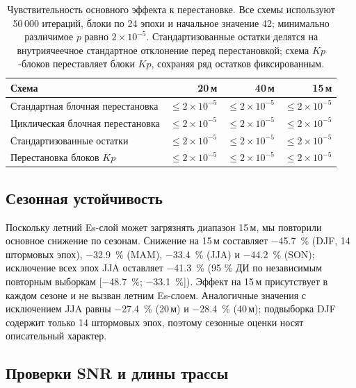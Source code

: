 \documentclass{agujournal2019}
\begin{document}
\begin{table}[h]
	\centering
	\small
	\caption{Чувствительность основного эффекта к перестановке. Все схемы
		используют 50\,000 итераций, блоки по 24 эпохи и начальное значение 42;
		минимально различимое $p$ равно $2 \times 10^{-5}$.
		Стандартизованные остатки делятся на внутриячеечное стандартное
		отклонение перед перестановкой; схема $Kp$-блоков переставляет
		блоки $Kp$, сохраняя ряд остатков фиксированным.}
	\label{tab:perm}
	\begin{tabular}{lrrr}
		\toprule
		Схема & 20\,м & 40\,м & 15\,м \\
		\midrule
		Стандартная блочная перестановка      & $\le 2\times10^{-5}$ & $\le 2\times10^{-5}$ & $\le 2\times10^{-5}$ \\
		Циклическая блочная перестановка      & $\le 2\times10^{-5}$ & $\le 2\times10^{-5}$ & $\le 2\times10^{-5}$ \\
		Стандартизованные остатки          & $\le 2\times10^{-5}$ & $\le 2\times10^{-5}$ & $\le 2\times10^{-5}$ \\
		Перестановка блоков $Kp$          & $\le 2\times10^{-5}$ & $\le 2\times10^{-5}$ & $\le 2\times10^{-5}$ \\
		\bottomrule
	\end{tabular}
\end{table}

\subsection{Сезонная устойчивость}

Поскольку летний Es-слой может загрязнять диапазон 15\,м,
мы повторили основное снижение по сезонам. Снижение на 15\,м составляет
\SI{-45.7}{\percent} (DJF, 14 штормовых эпох), \SI{-32.9}{\percent} (MAM),
\SI{-33.4}{\percent} (JJA) и \SI{-44.2}{\percent} (SON); исключение всех
эпох JJA оставляет \SI{-41.3}{\percent} (95 \% ДИ по независимым повторным выборкам
[\SI{-48.7}{\percent}; \SI{-33.1}{\percent}]). Эффект на 15\,м присутствует
в каждом сезоне и не вызван летним Es-слоем. Аналогичные значения
с исключением JJA равны \SI{-27.4}{\percent} (20\,м) и
\SI{-28.4}{\percent} (40\,м); подвыборка DJF содержит только 14 штормовых
эпох, поэтому сезонные оценки носят описательный характер.

\subsection{Проверки SNR и длины трассы}
\end{document}
